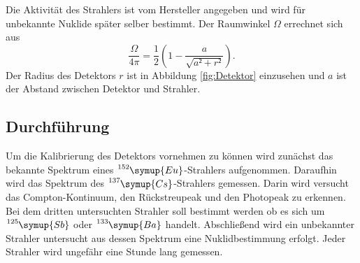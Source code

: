 Die Aktivität des Strahlers ist vom Hersteller angegeben und wird für unbekannte Nuklide später selber bestimmt.
Der Raumwinkel $\Omega$ errechnet sich aus
\begin{equation}
\label{eqn:raum}
\frac{\Omega}{4\pi}=\frac12\left(1-\frac a{\sqrt{a²+r²}}\right).
\end{equation}
Der Radius des Detektors $r$ ist in Abbildung \ref{fig:Detektor} einzusehen und $a$ ist der Abstand zwischen Detektor und Strahler.
\subsection{Durchführung}
Um die Kalibrierung des Detektors vornehmen zu können wird zunächst das bekannte Spektrum eines $\ce{^{152}}\symup{Eu}$-Strahlers aufgenommen.
Daraufhin wird das Spektrum des $\ce{^{137}}\symup{Cs}$-Strahlers gemessen.
Darin wird versucht das Compton-Kontinuum, den Rückstreupeak und den Photopeak zu erkennen.
Bei dem dritten untersuchten Strahler soll bestimmt werden ob es sich um $\ce{^{125}}\symup{Sb}$ oder $\ce{^{133}}\symup{Ba}$ handelt.
Abschließend wird ein unbekannter Strahler untersucht aus dessen Spektrum eine Nuklidbestimmung erfolgt.
Jeder Strahler wird ungefähr eine Stunde lang gemessen.